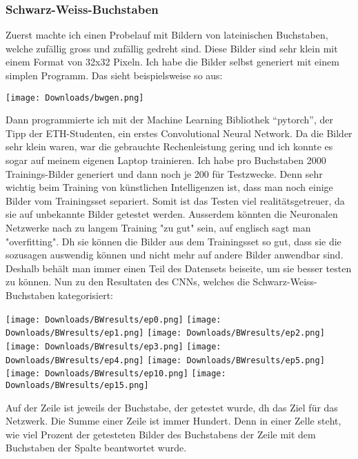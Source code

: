 \documentclass[10pt,a4paper,ngerman,english]{article}
\begin{document}
\subsubsection{Schwarz-Weiss-Buchstaben}

Zuerst machte ich einen Probelauf mit Bildern von lateinischen Buchstaben, welche zufällig gross und zufällig gedreht sind. Diese Bilder sind sehr klein mit einem Format von 32x32 Pixeln. Ich habe die Bilder selbst generiert mit einem simplen Programm. Das sieht beispielsweise so aus:

\begin{center}
    \texttt{[image: Downloads/bwgen.png]}
\end{center}

Dann programmierte ich mit der Machine Learning Bibliothek \enquote{pytorch}, der Tipp der ETH-Studenten, ein erstes Convolutional Neural Network. Da die Bilder sehr klein waren, war die gebrauchte Rechenleistung gering und ich konnte es sogar auf meinem eigenen Laptop trainieren. Ich habe pro Buchstaben 2000 Trainings-Bilder generiert und dann noch je 200 für Testzwecke. Denn sehr wichtig beim Training von künstlichen Intelligenzen ist, dass man noch einige Bilder vom Trainingsset separiert. Somit ist das Testen viel realitätsgetreuer, da sie auf unbekannte Bilder getestet werden. Ausserdem könnten die Neuronalen Netzwerke nach zu langem Training "zu gut" sein, auf englisch sagt man "overfitting". Dh sie können die Bilder aus dem Trainingsset so gut, dass sie die sozusagen auswendig können und nicht mehr auf andere Bilder anwendbar sind. Deshalb behält man immer einen Teil des Datensets beiseite, um sie besser testen zu können. Nun zu den Resultaten des CNNs, welches die Schwarz-Weiss-Buchstaben kategorisiert:

\begin{center}
    \texttt{[image: Downloads/BWresults/ep0.png]}
    \texttt{[image: Downloads/BWresults/ep1.png]}
    \texttt{[image: Downloads/BWresults/ep2.png]}
    \texttt{[image: Downloads/BWresults/ep3.png]}
    \texttt{[image: Downloads/BWresults/ep4.png]}
    \texttt{[image: Downloads/BWresults/ep5.png]}
    \texttt{[image: Downloads/BWresults/ep10.png]}
    \texttt{[image: Downloads/BWresults/ep15.png]}
\end{center}

Auf der Zeile ist jeweils der Buchstabe, der getestet wurde, dh das Ziel für das Netzwerk. Die Summe einer Zeile ist immer Hundert. Denn in einer Zelle steht, wie viel Prozent der getesteten Bilder des Buchstabens der Zeile mit dem Buchstaben der Spalte beantwortet wurde.\\
\end{document}
